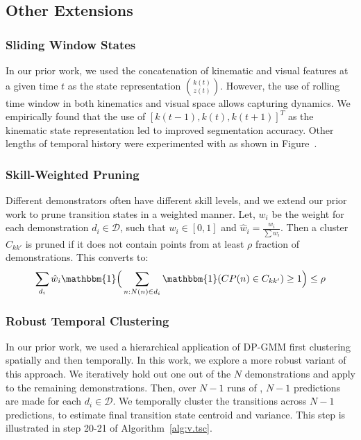 \subsection{Other Extensions}
\subsubsection{Sliding Window States}
In our prior work, we used the concatenation of kinematic and visual features at a given time $t$ as the state representation $\binom{k(t)}{z(t)}$. However, the use of rolling time window in both kinematics and visual space allows capturing dynamics. 
We empirically found that the use of $[k(t-1), k(t), k(t+1)]^T$ as the kinematic state representation led to improved segmentation accuracy. Other lengths of temporal history were experimented with as shown in Figure~.

\subsubsection{Skill-Weighted Pruning} 
Different demonstrators often have different skill levels, and we extend our prior work to prune transition states in a weighted manner.
Let, $w_i$ be the weight for each demonstration $d_i \in \mathcal{D}$, such that $w_i \in [0,1]$ and $\hat{w}_i = \frac{w_i}{\sum w_i}$. Then a cluster $C_{kk'}$ is pruned if it does not contain points from at least $\rho$ fraction of demonstrations. This converts to:
\[\sum_{d_i} \hat{w}_i\mathbbm{1}\Big( \sum_{n:N(n)\in d_i} \mathbbm{1}( CP(n) \in C_{kk'}) \geq 1 \Big) \leq \rho 
\]


\subsubsection{Robust Temporal Clustering}
In our prior work, we used a hierarchical application of DP-GMM first clustering spatially and then temporally. In this work, we explore a more robust variant of this approach.
We iteratively hold out one out of the $N$ demonstrations and apply \tsc to the remaining demonstrations.
Then, over $N-1$ runs of \tsc, $N-1$ predictions are made for each $d_i \in \mathcal{D}$. We temporally cluster the transitions across $N-1$ predictions, to estimate final transition state centroid and variance. This step is illustrated in step 20-21 of Algorithm~\ref{alg:v.tsc}.

